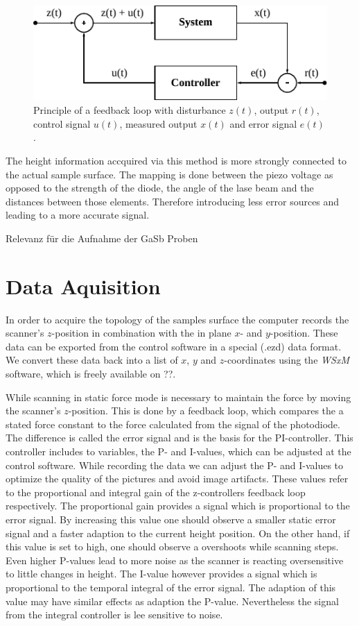 \documentclass[paper=a4,fontsize=10pt,DIV=18,twocolumn,parskip=half]{scrartcl}
\numberwithin{equation}{section}    %
\begin{document}
\begin{figure}
    \centering
    \includegraphics{Bilder/control_loop.pdf}
    \caption{Principle of a feedback loop with disturbance $z(t)$, output 
        $r(t)$, control signal $u(t)$, measured output $x(t)$ and error signal 
        $e(t)$.}
    \label{fig:control_loop}
\end{figure}

The height information accquired via this method is more strongly connected to 
the actual sample surface. The mapping is done between the piezo voltage as 
opposed to the strength of the diode, the angle of the lase beam and the 
distances between those elements. Therefore introducing less error sources and 
leading to a more accurate signal.

Relevanz für die Aufnahme der GaSb Proben\\


\section{Data Aquisition}
\label{dataaquisition}
In order to acquire the topology of the samples surface the computer records the scanner's $z$-position in combination with the in plane $x$- and $y$-position. These data can be exported from the control software in a special (.ezd) data format. We convert these data back into a list of $x$, $y$ and $z$-coordinates using the \textit{WSxM} software, which is freely available on ??. 

While scanning in static force mode is necessary to maintain the force by moving the scanner's $z$-position. This is done by a feedback loop, which compares the a stated force constant to the force calculated from the signal of the photodiode. The difference is called the error signal and is the basis for the PI-controller. This controller includes to variables, the P- and I-values, which can be adjusted at the control software.
While recording the data we can adjust the P- and I-values to optimize the quality of the pictures and avoid image artifacts. These values refer to the proportional and integral gain of the z-controllers feedback loop respectively. The proportional gain provides a signal which is proportional to the error signal. By increasing this value one should observe a smaller static error signal and a faster adaption to the current height position.
On the other hand, if this value is set to high, one should observe a overshoots while scanning steps. Even higher P-values lead to more noise as the scanner is reacting oversensitive to little changes in height. The I-value however provides a signal which is proportional to the temporal integral of the error signal. The adaption of this value may have similar effects as adaption the P-value. Nevertheless the signal from the integral controller is lee sensitive to noise.
\end{document}
